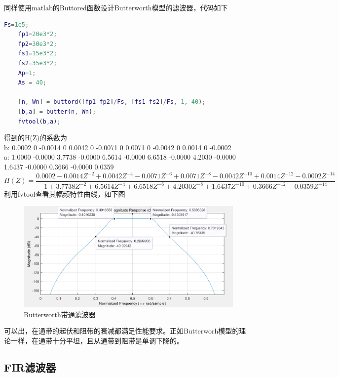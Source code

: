 \documentclass[UTF8]{ctexart}
\begin{document}
同样使用matlab的Buttored函数设计Butterworth模型的滤波器，代码如下
\begin{lstlisting}[language=matlab]
	Fs=1e5;
	fp1=20e3*2;
	fp2=30e3*2;
	fs1=15e3*2;
	fs2=35e3*2;
	Ap=1;
	As = 40;
	
	[n, Wn] = buttord([fp1 fp2]/Fs, [fs1 fs2]/Fs, 1, 40);
	[b,a] = butter(n, Wn);
	fvtool(b,a);
\end{lstlisting}
 得到的H(Z)的系数为\\
 \hspace*{2em}b: 0.0002 0   -0.0014  0 0.0042  0 -0.0071 0 0.0071  0   -0.0042  0    0.0014    0   -0.0002\\
 \hspace*{2em}a: 1.0000 -0.0000  3.7738 -0.0000  6.5614   -0.0000    6.6518   -0.0000    4.2030   -0.0000    1.6437   -0.0000    0.3666   -0.0000   0.0359\\
 \[
 H(Z)=\frac{0.0002-0.0014Z^{-2}+0.0042Z^{-4}-0.0071Z^{-6}+0.0071Z^{-8}-0.0042Z^{-10}+0.0014Z^{-12}-0.0002Z^{-14}}{1+3.7738Z^{-2}+6.5614Z^{-4}+6.6518Z^{-6}+4.2030Z^{-8}+1.6437Z^{-10}+0.3666Z^{-12}-0.0359Z^{-14}}
 \]
 利用fvtool查看其幅频特性曲线，如下图
 \begin{figure}[H]
 	\centering
 	\includegraphics[scale=0.8]{figs/iir3}
 	\caption{Butterworth带通滤波器}
 \end{figure}
可以出，在通带的起伏和阻带的衰减都满足性能要求。正如Butterworh模型的理论一样，在通带十分平坦，且从通带到阻带是单调下降的。
\subsection{FIR滤波器}
\end{document}
